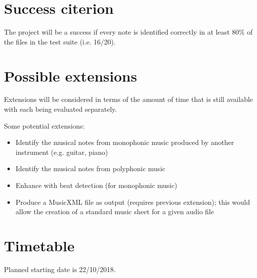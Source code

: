 \documentclass[12pt,a4paper,twoside]{article}
\begin{document}
\section*{Success citerion}

The project will be a success if every note is identified correctly in at least 80\% of the files in the test suite (i.e. 16/20).

\section*{Possible extensions}

Extensions will be considered in terms of the amount of time that is still available with each being evaluated separately.

Some potential extensions:
\begin{itemize}
    \item Identify the musical notes from monophonic music produced by another instrument (e.g. guitar, piano)
    \item Identify the musical notes from polyphonic music
    \item Enhance with beat detection (for monophonic music)
    \item Produce a MusicXML file as output (requires previous extension); this would allow the creation of a standard music sheet for a given audio file
\end{itemize}

\section*{Timetable}


Planned starting date is 22/10/2018.
\end{document}
